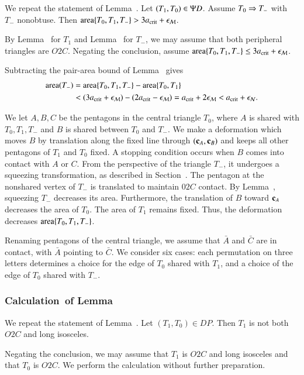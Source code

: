 We repeat the statement of Lemma~.  Let
$(T_1,T_0)\in\Psi D$. Assume $T_0\Rightarrow T_-$ with $T_-$ nonobtuse.  Then ${\operatorname{area}}\{T_0,T_1,T_-\} >
3a_\text{crit} + \epsilon_{\mathcal M}$. %

By Lemma~ for $T_1$ and
Lemma~ for $T_-$, we may assume that both
peripheral triangles are $O2C$.  Negating the conclusion, assume
${\operatorname{area}}\{T_0,T_1,T_-\}\le3a_\text{crit}+\epsilon_{\mathcal M}$.

Subtracting the pair-area bound of
Lemma~ gives
\begin{align*}
{\operatorname{area}}(T_-) &= {\operatorname{area}}\{T_0,T_1,T_-\} - {\operatorname{area}}\{T_0,T_1\} \\
&< (3a_\text{crit}+\epsilon_{\mathcal M}) - (2a_\text{crit} - \epsilon_{\mathcal M}) = a_\text{crit} + 2\epsilon_{\mathcal M} < a_\text{crit}+\epsilon_{\mathcal N}.
\end{align*}

We let $A,B,C$ be the pentagons in the central triangle $T_0$, where
$A$ is shared with $T_0,T_1,T_-$ and $B$ is shared between $T_0$ and
$T_-$.  We make a deformation which moves $B$ by translation along the
fixed line through $({\mathbf c}_A,{\mathbf c}_B)$ and keeps all other pentagons of
$T_1$ and $T_0$ fixed.  A stopping condition occurs when $B$ comes
into contact with $A$ or $C$.  From the perspective of the triangle
$T_-$, it undergoes a squeezing transformation, as described in
Section~.  The pentagon at the nonshared vertex of
$T_-$ is translated to maintain $02C$ contact.  By
Lemma~, squeezing $T_-$ decreases its area.
Furthermore, the translation of $B$ toward ${\mathbf c}_A$ decreases the area
of $T_0$.  The area of $T_1$ remains fixed.  Thus, the deformation
decreases ${\operatorname{area}}\{T_0,T_1,T_-\}$.

Renaming pentagons of the central triangle, we assume that $\bar A$
and $\bar C$ are in contact, with $\bar A$ pointing to $\bar C$.  We
consider six cases: each permutation on three letters determines a
choice for the edge of $T_0$ shared with $T_1$, and a choice of the
edge of $T_0$ shared with $T_-$.

\subsubsection{Calculation~of Lemma~}

We repeat the statement of Lemma~.  Let
$(T_1,T_0)\in DP$.  Then $T_1$ is not both $O2C$ and long isosceles.

Negating the conclusion, we may assume that $T_1$ is $O2C$ and long
isosceles and that $T_0$ is $O2C$.  We perform the calculation without
further preparation.

